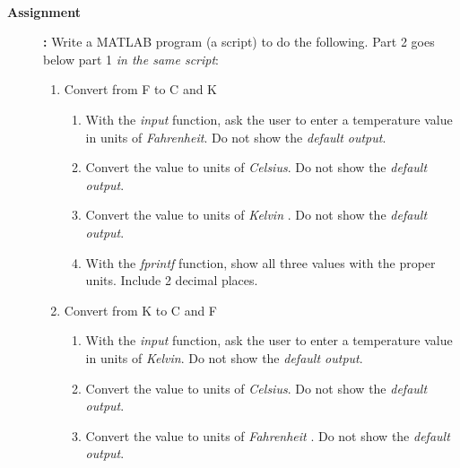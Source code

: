 \documentclass[11pt]{article}
\begin{document}
\begin{description}
                \hspace{15mm}    \scalebox{1.5}{$^\circ K=^\circ C +273.15$} \\ 
                                 
             \newpage                   
         


   
        \item [\textbf{ \Large Assignment}] \textbf{ \Large :}
            Write a MATLAB program (a script) to  do the following. Part 2 goes below part 1 {\it in the same script}:\\
            \begin{enumerate}
            \item Convert from F to C and K
            \begin{enumerate}
            \item
           With the {\it input} function, ask the user to enter a temperature value in units of {\it Fahrenheit}. Do not show the {\it default output}.
           
           \item 
           Convert the value to units of {\it Celsius}. Do not show the {\it default output}.
           
           \item 
           Convert the value to units of {\it Kelvin} . Do not show the {\it default output}.
           
           \item 
           With the {\it fprintf} function, show all three values with the proper units. Include 2 decimal places. \\
           
           
             \end{enumerate}
               \item Convert from K to C and F
            \begin{enumerate}
            \item
           With the {\it input} function, ask the user to enter a temperature value in units of {\it Kelvin}. Do not show the {\it default output}.
           
           \item 
           Convert the value to units of {\it Celsius}. Do not show the {\it default output}.
           
           \item 
           Convert the value to units of {\it Fahrenheit} . Do not show the {\it default output}.
           

\end{enumerate}
\end{enumerate}
\end{description}
\end{document}
